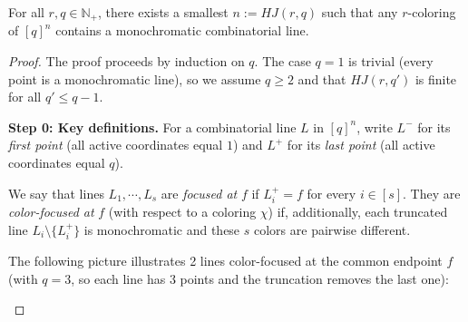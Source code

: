 \documentclass[11pt, a4paper]{ctexrep}
\begin{document}
\begin{theorem}
    For all $r,q\in \mathbb{N}_+$, there exists a smallest $n:=HJ(r,q)$ such that any $r$-coloring of $[q]^n$ contains a monochromatic combinatorial line.
\end{theorem}

\begin{proof}
    The proof proceeds by induction on $q$. The case $q=1$ is trivial (every point is a monochromatic line), so we assume $q\geqslant 2$ and that $HJ(r,q')$ is finite for all $q'\leqslant q-1$.

    \medskip
    \noindent\textbf{Step 0: Key definitions.}
    For a combinatorial line $L$ in $[q]^n$, write $L^{-}$ for its \emph{first point} (all active coordinates equal $1$) and $L^+$ for its \emph{last point} (all active coordinates equal $q$).

    We say that lines $L_1,\cdots,L_s$ are \emph{focused at} $f$ if $L_i^+=f$ for every $i\in [s]$.
    They are \emph{color-focused at} $f$ (with respect to a coloring $\chi$) if, additionally, each truncated line $L_i\setminus\{L_i^+\}$ is monochromatic and these $s$ colors are pairwise different.

    The following picture illustrates 2 lines color-focused at the common endpoint $f$ (with $q=3$, so each line has 3 points and the truncation removes the last one):
    \begin{center}
    \end{center}


\end{proof}
\end{document}
